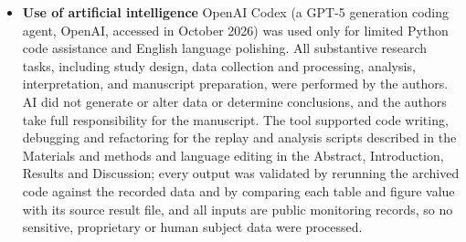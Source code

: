 \documentclass[lineno,pdflatex,sn-apa]{sn-jnl}%
\theoremstyle{thmstyleone}%
\theoremstyle{thmstyletwo}%
\theoremstyle{thmstylethree}%
\begin{document}
\begin{itemize}
\item \textbf{Use of artificial intelligence} OpenAI Codex (a GPT-5 generation coding agent, OpenAI, accessed in October 2026) was used only for limited Python code assistance and English language polishing. All substantive research tasks, including study design, data collection and processing, analysis, interpretation, and manuscript preparation, were performed by the authors. AI did not generate or alter data or determine conclusions, and the authors take full responsibility for the manuscript. The tool supported code writing, debugging and refactoring for the replay and analysis scripts described in the Materials and methods and language editing in the Abstract, Introduction, Results and Discussion; every output was validated by rerunning the archived code against the recorded data and by comparing each table and figure value with its source result file, and all inputs are public monitoring records, so no sensitive, proprietary or human subject data were processed.
\end{itemize}


\end{document}
